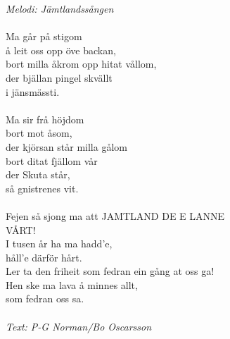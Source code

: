 {\footnotesize\textit{Melodi: Jämtlandssången}}\\
\\
Ma går på stigom\\
å leit oss opp öve backan,\\
bort milla åkrom opp hitat vållom,\\
der bjällan pingel skvällt\\
i jänsmässti.\\
\\
Ma sir frå höjdom\\
bort mot åsom,\\
der kjörsan står milla gålom\\
bort ditat fjällom vår\\
der Skuta står,\\
så gnistrenes vit.\\
\\
\revrpt Fejen så sjong ma att JAMTLAND DE E LANNE\\
VÅRT!\\
I tusen år ha ma hadd’e,\\
håll’e därför hårt.\\
Ler ta den friheit som fedran ein gång at oss ga!\\
Hen ske ma lava å minnes allt,\\
som fedran oss sa.\rpt\\
\\
{\footnotesize\textit{Text: P-G Norman/Bo Oscarsson}}
\clearpage

